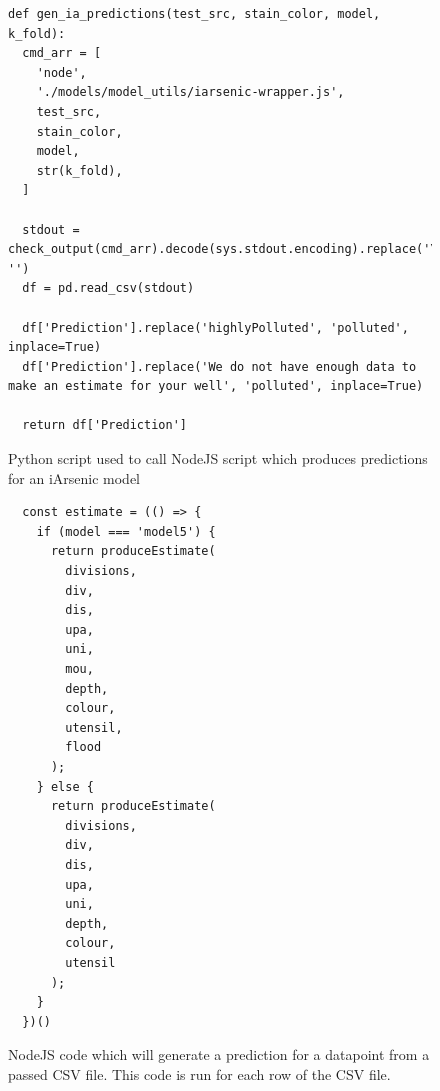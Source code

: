 \begin{figure}[h]
    \begin{verbatim}
def gen_ia_predictions(test_src, stain_color, model, k_fold):
  cmd_arr = [
    'node',
    './models/model_utils/iarsenic-wrapper.js',
    test_src,
    stain_color,
    model,
    str(k_fold),
  ]

  stdout = check_output(cmd_arr).decode(sys.stdout.encoding).replace('\n', '')
  df = pd.read_csv(stdout)
  
  df['Prediction'].replace('highlyPolluted', 'polluted', inplace=True)
  df['Prediction'].replace('We do not have enough data to make an estimate for your well', 'polluted', inplace=True)

  return df['Prediction']
        \end{verbatim}
    \caption{Python script used to call NodeJS script which produces predictions for an iArsenic model}
    \label{fig:x py_call_node}
\end{figure}

\begin{figure}[h]
    \begin{verbatim}
  const estimate = (() => {
    if (model === 'model5') {
      return produceEstimate(
        divisions,
        div,
        dis,
        upa,
        uni,
        mou,
        depth,
        colour,
        utensil,
        flood
      );
    } else {
      return produceEstimate(
        divisions,
        div,
        dis,
        upa,
        uni,
        depth,
        colour,
        utensil
      );
    }
  })()
      \end{verbatim}
    \caption{NodeJS code which will generate a prediction for a datapoint from a passed CSV file. This code is run for each row of the CSV file.}
    \label{fig:x programatically_gen_ia_predictions}
\end{figure}


